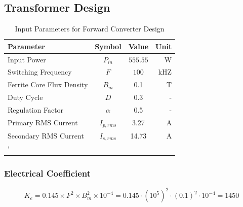 \subsection{Transformer Design}
\begin{table}[h!]
\centering
\caption{Input Parameters for Forward Converter Design}
\label{tab:input_parameters}
\begin{tabular}{lccr}
\toprule
\textbf{Parameter} & \textbf{Symbol} & \textbf{Value} & \textbf{Unit} \\ 
\midrule
Input Power & \( P_{in} \) & \( 555.55\) & W \\ 
Switching Frequency & \( F \) & \( 100\) & kHZ \\ 
Ferrite Core Flux Density & \( B_m \) & 0.1 & T \\ 
Duty Cycle & \( D \) & 0.3 & - \\ 
Regulation Factor & \( \alpha \) & 0.5 & - \\ 
Primary RMS Current & \( I_{p,rms} \) & 3.27 & A \\ 
Secondary RMS Current & \( I_{s,rms} \) & 14.73 & A \\ 
\bottomrule`    
\end{tabular}
\end{table}
\subsubsection*{Electrical Coefficient }
\[
K_e = 0.145 \times F^2 \times B_m^2 \times 10^{-4} = 0.145 \cdot (10^5)^2 \cdot (0.1)^2 \cdot 10^{-4} = 1450
\]
